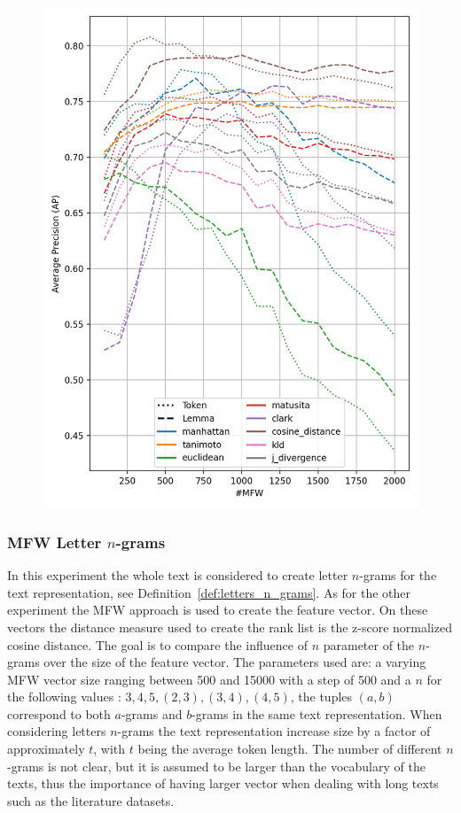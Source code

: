 \begin{figure}
  \label{fig:token_vs_lemma_st_jean}
  \includegraphics[width=0.9\linewidth]{img/token_vs_lemma_st_jean.png}
\end{figure}

\subsubsection{MFW Letter $n$-grams}

In this experiment the whole text is considered to create letter $n$-grams for the text representation, see Definition~\ref{def:letters_n_grams}.
As for the other experiment the MFW approach is used to create the feature vector.
On these vectors the distance measure used to create the rank list is the z-score normalized cosine distance.
The goal is to compare the influence of $n$ parameter of the $n$-grams over the size of the feature vector.
The parameters used are: a varying MFW vector size ranging between 500 and 15000 with a step of 500 and a $n$ for the following values : $3, 4, 5, (2, 3), (3, 4), (4, 5)$, the tuples $(a, b)$ correspond to both $a$-grams and $b$-grams in the same text representation.
When considering letters $n$-grams the text representation increase size by a factor of approximately $t$, with $t$ being the average token length.
The number of different $n$-grams is not clear, but it is assumed to be larger than the vocabulary of the texts, thus the importance of having larger vector  when dealing with long texts such as the literature datasets.

